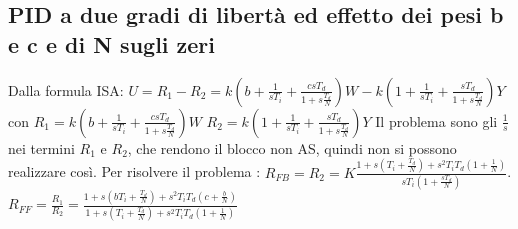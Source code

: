 \begin{landscape}
\begin{multicols*}{2}
    \subsection{PID a due gradi di libertà ed effetto dei pesi b e c e di N sugli zeri}
    Dalla formula ISA:\newline
    $U = R_1 - R_2 =  k \left( b + \frac{1}{sT_i} + \frac{c s T_d}{1 + s \frac{T_d}{N}} \right) W - k\left( 1 + \frac{1}{sT_i} + \frac{sT_d}{1 + s \frac{T_d}{N}} \right)Y$ \newline
    con \newline
    $R_1 = k \left( b + \frac{1}{sT_i} + \frac{c s T_d}{1 + s \frac{T_d}{N}} \right) W$\newline
    $R_2 = k\left( 1 + \frac{1}{sT_i} + \frac{sT_d}{1 + s \frac{T_d}{N}} \right)Y$\newline
    \newline
    Il problema sono gli $\frac{1}{s}$ nei termini $R_1$ e $R_2$, che rendono il blocco non AS, quindi non si possono realizzare così.\newline
    \newline
    Per risolvere il problema :\newline
    $R_{FB} = R_2 =  K \frac{1 + s\left(T_i + \frac{T_d}{N}\right) + s^2 T_i T_d \left(1 + \frac{1}{N}\right)}{sT_i \left( 1 + \frac{sT_d}{N}\right)}$.\newline
    $R_{FF} = \frac{R_1}{R_2} =  \frac{1+ s\left(bT_i + \frac{T_d}{N}\right) + s^2 T_i T_d \left(c + \frac{b}{N}\right)}{1 + s \left( T_i + \frac{T_d}{N} \right) + s^2 T_i T_d \left( 1 + \frac{1}{N} \right)}$

\end{multicols*}
\end{landscape}
